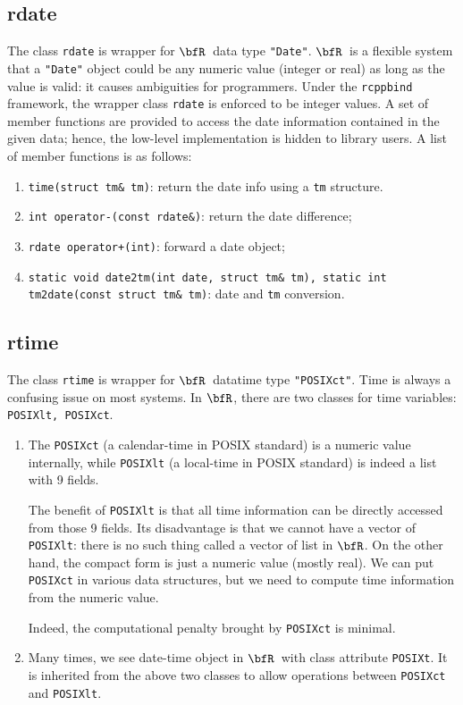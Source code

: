 \documentclass{article}
\newcommand{\R}{$\bfR$}
\begin{document}
\subsection{rdate}

The class \texttt{rdate} is wrapper for \R\ data type \texttt{"Date"}.
\R\ is a flexible system that a \texttt{"Date"} object could
be any numeric value (integer or real) as long as the value
is valid: it causes ambiguities for programmers.  Under the
\texttt{rcppbind} framework, the wrapper class \texttt{rdate}
is enforced to be integer values. A set of member functions
are provided to access the date information contained in the
given data; hence, the low-level implementation is hidden to
library users. A list of member functions is as follows:
\begin{enumerate}
  \item \texttt{time(struct tm\& tm)}: return the date info
    using a \texttt{tm} structure.
  \item \texttt{int operator-(const rdate\&)}: return the date difference;
  \item \texttt{rdate operator+(int)}: forward a date object;
  \item \texttt{static void date2tm(int date, struct tm\& tm),
    static int tm2date(const struct tm\& tm)}: date and
    \texttt{tm} conversion.
\end{enumerate}
 
\subsection{rtime}
 
The class \texttt{rtime} is wrapper for \R\ datatime type
\texttt{"POSIXct"}. Time is always a confusing issue on most
systems. In \R, there are two classes for time variables:
\texttt{POSIXlt, POSIXct}.
\begin{enumerate}
  \item The \texttt{POSIXct} (a calendar-time in POSIX
    standard) is a numeric value internally, while
    \texttt{POSIXlt} (a local-time in POSIX standard) is
    indeed a list with 9 fields.

    The benefit of \texttt{POSIXlt} is that all time
    information can be directly accessed from those 9 fields.
    Its disadvantage is that we cannot have a vector of
    \texttt{POSIXlt}: there is no such thing called a vector
    of list in \R. On the other hand, the compact form is
    just a numeric value (mostly real). We can put
    \texttt{POSIXct} in various data structures, but we need
    to compute time information from the numeric value.

    Indeed, the computational penalty brought by
    \texttt{POSIXct} is minimal.
  \item Many times, we see date-time object in \R\ with class
    attribute \texttt{POSIXt}. It is inherited from the above
    two classes to allow operations between \texttt{POSIXct}
    and \texttt{POSIXlt}.
\end{enumerate}
\end{document}
